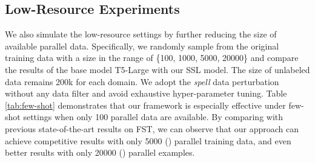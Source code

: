 \subsection{Low-Resource Experiments}
\label{sec:low}
We also simulate the low-resource settings by further reducing the size of available parallel data. Specifically, we randomly sample from the original training data with a size in the range of \{100, 1000, 5000, 20000\} and compare the results of the base model T5-Large with our SSL model. The size of unlabeled data remains 200k for each domain. We adopt the \textit{spell} data perturbation without any data filter and avoid exhaustive hyper-parameter tuning. Table \ref{tab:few-shot} demonstrates that our framework is especially effective under few-shot settings when only 100 parallel data are available. By comparing with previous state-of-the-art results on FST, we can observe that our approach can achieve competitive results with only 5000 () parallel training data, and even better results with only 20000 () parallel examples. 



